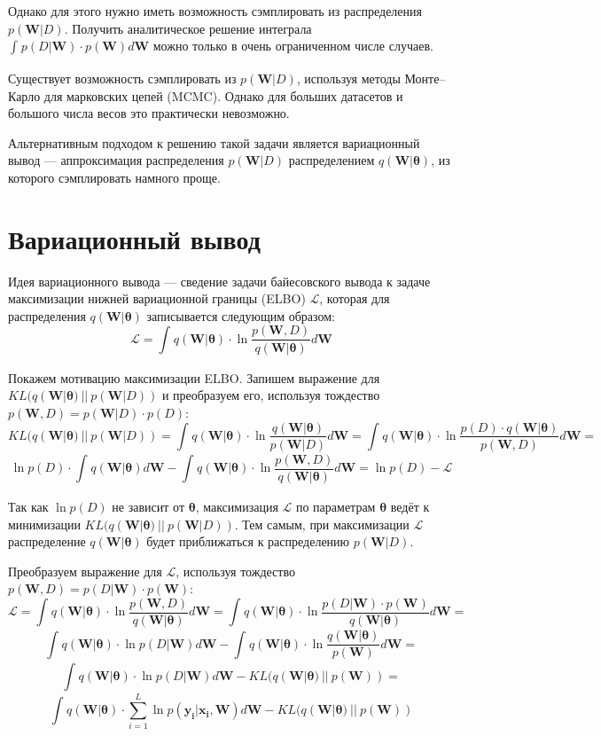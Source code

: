 \documentclass{article}
\begin{document}
Однако для этого нужно иметь возможность сэмплировать из распределения $p(\pmb{W}| D)$. Получить аналитическое решение интеграла $\int_{}{} p(D | \pmb{W}) \cdot p(\pmb{W}) d \pmb{W}$ можно только в очень ограниченном числе случаев.

Существует возможность сэмплировать из $p(\pmb{W}| D)$, используя методы Монте--Карло для марковских цепей (MCMC). Однако для больших датасетов и большого числа весов это практически невозможно.

Альтернативным подходом к решению такой задачи является вариационный вывод --- аппроксимация распределения $p(\pmb{W}| D)$ распределением $q(\pmb{W} | \pmb{\theta})$, из которого сэмплировать намного проще.

\section{Вариационный вывод}

Идея вариационного вывода --- сведение задачи байесовского вывода к задаче максимизации нижней вариационной границы (ELBO) $\mathcal{L}$, которая для распределения $q(\pmb{W} | \pmb{\theta})$ записывается следующим образом:
\[
 \mathcal{L} =
 \int_{}{} q(\pmb{W} | \pmb{\theta}) \cdot \ln{\dfrac{p(\pmb{W}, D)}{q(\pmb{W} | \pmb{\theta})}} d \pmb{W}
\]

Покажем мотивацию максимизации ELBO. Запишем выражение для $KL(q(\pmb{W} | \pmb{\theta})~||~p(\pmb{W}| D))$ и преобразуем его, используя тождество $p(\pmb{W}, D) = p(\pmb{W}| D)\cdot p(D)$:
\[
 KL(q(\pmb{W} | \pmb{\theta})~||~p(\pmb{W}| D)) =
 \int_{}{} q(\pmb{W} | \pmb{\theta}) \cdot \ln{\dfrac{q(\pmb{W} | \pmb{\theta})}{p(\pmb{W}| D)}} d \pmb{W} =
 \int_{}{} q(\pmb{W} | \pmb{\theta}) \cdot \ln{\dfrac{p(D) \cdot q(\pmb{W} | \pmb{\theta})}{p(\pmb{W}, D)}} d \pmb{W} =
\]\[
 \ln{p(D)} \cdot \int_{}{} q(\pmb{W} | \pmb{\theta}) d \pmb{W} - \int_{}{} q(\pmb{W} | \pmb{\theta}) \cdot \ln{\dfrac{p(\pmb{W}, D)}{q(\pmb{W} | \pmb{\theta})}} d \pmb{W} =
 \ln{p(D)} - \mathcal{L}
\]

Так как $\ln{p(D)}$ не зависит от $\pmb{\theta}$, максимизация $\mathcal{L}$ по параметрам $\pmb{\theta}$ ведёт к минимизации $KL(q(\pmb{W} | \pmb{\theta})~||~p(\pmb{W}| D))$. Тем самым, при максимизации $\mathcal{L}$ распределение $q(\pmb{W} | \pmb{\theta})$ будет приближаться к распределению $p(\pmb{W}| D)$.

Преобразуем выражение для $\mathcal{L}$, используя тождество $p(\pmb{W}, D) = p(D | \pmb{W}) \cdot p(\pmb{W})$:
\[
 \mathcal{L} =
 \int_{}{} q(\pmb{W} | \pmb{\theta}) \cdot \ln{\dfrac{p(\pmb{W}, D)}{q(\pmb{W} | \pmb{\theta})}} d \pmb{W} =
 \int_{}{} q(\pmb{W} | \pmb{\theta}) \cdot \ln{\dfrac{p(D | \pmb{W}) \cdot p(\pmb{W})}{q(\pmb{W} | \pmb{\theta})}} d \pmb{W} =
\]\[
 \int_{}{} q(\pmb{W} | \pmb{\theta}) \cdot \ln{p(D | \pmb{W})} d \pmb{W} - \int_{}{} q(\pmb{W} | \pmb{\theta}) \cdot \ln{\dfrac{q(\pmb{W} | \pmb{\theta})}{p(\pmb{W})}} d \pmb{W} =
\]\[
 \int_{}{} q(\pmb{W} | \pmb{\theta}) \cdot \ln{p(D | \pmb{W})} d \pmb{W} - KL(q(\pmb{W} | \pmb{\theta})~||~p(\pmb{W})) =
\]\[
 \int_{}{} q(\pmb{W} | \pmb{\theta}) \cdot \sum_{i=1}^{L} {\ln{p(\pmb{y_{i}} | \pmb{x_{i}}, \pmb{W})}} d \pmb{W} - KL(q(\pmb{W} | \pmb{\theta})~||~p(\pmb{W}))
\]
\end{document}
